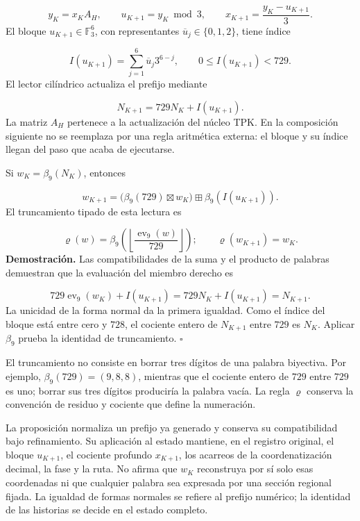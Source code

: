 \[
y_K=x_KA_H,\qquad
u_{K+1}=y_K\bmod3,\qquad
x_{K+1}=\frac{y_K-u_{K+1}}3.
\]
El bloque \(u_{K+1}\in\mathbb F_3^6\), con representantes \(\overline u_j\in\{0,1,2\}\), tiene índice

\[
I(u_{K+1})=\sum_{j=1}^{6}\overline u_j3^{6-j},
\qquad 0\leq I(u_{K+1})<729.
\]
El lector cilíndrico actualiza el prefijo mediante

\[
N_{K+1}=729N_K+I(u_{K+1}).
\]
La matriz \(A_H\) pertenece a la actualización del núcleo TPK. En la composición siguiente no se reemplaza por una regla aritmética externa: el bloque y su índice llegan del paso que acaba de ejecutarse.

Si \(w_K=\beta_9(N_K)\), entonces

\[
w_{K+1}
=\bigl(\beta_9(729)\boxtimes w_K\bigr)
\boxplus\beta_9(I(u_{K+1})).
\]
El truncamiento tipado de esta lectura es

\[
\varrho(w)=
\beta_9\!\left(
\left\lfloor\frac{\operatorname{ev}_9(w)}{729}\right\rfloor
\right);
\qquad \varrho(w_{K+1})=w_K.
\]
\textbf{Demostración.} Las compatibilidades de la suma y el producto de palabras demuestran que la evaluación del miembro derecho es

\[
729\operatorname{ev}_9(w_K)+I(u_{K+1})
=729N_K+I(u_{K+1})=N_{K+1}.
\]
La unicidad de la forma normal da la primera igualdad. Como el índice del bloque está entre cero y \(728\), el cociente entero de \(N_{K+1}\) entre \(729\) es \(N_K\). Aplicar \(\beta_9\) prueba la identidad de truncamiento. \hfill\(\square\)

El truncamiento no consiste en borrar tres dígitos de una palabra biyectiva. Por ejemplo, \(\beta_9(729)=(9,8,8)\), mientras que el cociente entero de \(729\) entre \(729\) es uno; borrar sus tres dígitos produciría la palabra vacía. La regla \(\varrho\) conserva la convención de residuo y cociente que define la numeración.

La proposición normaliza un prefijo ya generado y conserva su compatibilidad bajo refinamiento. Su aplicación al estado mantiene, en el registro original, el bloque \(u_{K+1}\), el cociente profundo \(x_{K+1}\), los acarreos de la coordenatización decimal, la fase y la ruta. No afirma que \(w_K\) reconstruya por sí solo esas coordenadas ni que cualquier palabra sea expresada por una sección regional fijada. La igualdad de formas normales se refiere al prefijo numérico; la identidad de las historias se decide en el estado completo.

